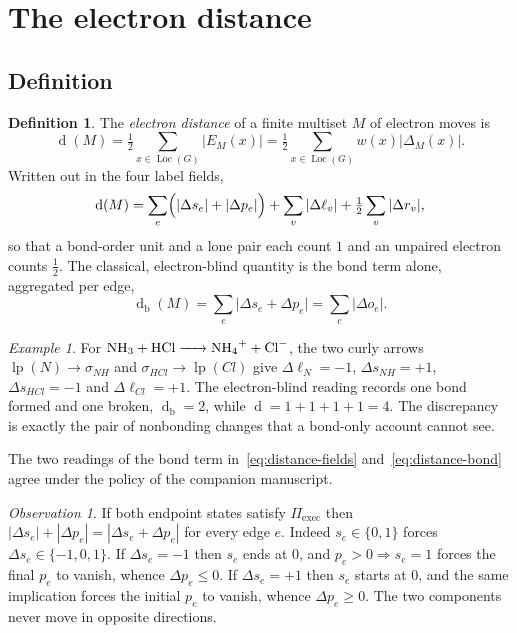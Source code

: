 \documentclass[11pt]{article}
\numberwithin{equation}{section}
\newcommand{\Loc}{\operatorname{Loc}}
\newcommand{\lp}{\operatorname{lp}}
\newcommand{\del}{\operatorname{d}}
\theoremstyle{plain}
\theoremstyle{definition}
\newtheorem{definition}[theorem]{Definition}
\theoremstyle{remark}
\newtheorem{observation}{Observation}
\newtheorem{example}[theorem]{Example}
\begin{document}
\section{The electron distance}
\label{sec:distance}

\subsection{Definition}

\begin{definition}
\label{def:distance}
The \emph{electron distance} of a finite multiset $M$ of electron moves is
\begin{equation}
  \del(M)=\tfrac12\sum_{x\in\Loc(G)}\bigl|E_M(x)\bigr|
        =\tfrac12\sum_{x\in\Loc(G)}w(x)\bigl|\Delta_M(x)\bigr| .
  \label{eq:distance}
\end{equation}
Written out in the four label fields,
\begin{equation}
  \del(M)=\sum_{e}\Bigl(|\Delta s_e|+|\Delta p_e|\Bigr)
         +\sum_{v}|\Delta\ell_v|
         +\tfrac12\sum_{v}|\Delta r_v| ,
  \label{eq:distance-fields}
\end{equation}
so that a bond-order unit and a lone pair each count $1$ and an unpaired
electron counts $\tfrac12$.  The classical, electron-blind quantity is the
bond term alone, aggregated per edge,
\begin{equation}
  \del_{\mathrm b}(M)=\sum_e\bigl|\Delta s_e+\Delta p_e\bigr|=\sum_e|\Delta o_e| .
  \label{eq:distance-bond}
\end{equation}
\end{definition}

\begin{example}
\label{ex:ammonia-hcl}
For $\ce{NH3 + HCl -> NH4+ + Cl-}$, the two curly arrows
$\lp(N)\to\sigma_{NH}$ and $\sigma_{HCl}\to\lp(Cl)$ give $\Delta\ell_N=-1$,
$\Delta s_{NH}=+1$, $\Delta s_{HCl}=-1$ and $\Delta\ell_{Cl}=+1$.  The
electron-blind reading records one bond formed and one broken,
$\del_{\mathrm b}=2$, while $\del=1+1+1+1=4$.  The discrepancy is exactly the
pair of nonbonding changes that a bond-only account cannot see.
\end{example}

The two readings of the bond term in~\eqref{eq:distance-fields}
and~\eqref{eq:distance-bond} agree under the policy of the companion
manuscript.

\begin{observation}
\label{obs:sigma-pi}
If both endpoint states satisfy $\Pi_{\mathrm{exec}}$ then
$|\Delta s_e|+|\Delta p_e|=|\Delta s_e+\Delta p_e|$ for every edge $e$.
Indeed $s_e\in\{0,1\}$ forces $\Delta s_e\in\{-1,0,1\}$.  If $\Delta s_e=-1$
then $s_e$ ends at $0$, and $p_e>0\Rightarrow s_e=1$ forces the final
$p_e$ to vanish, whence $\Delta p_e\le0$.  If $\Delta s_e=+1$ then $s_e$
starts at $0$, and the same implication forces the initial $p_e$ to vanish,
whence $\Delta p_e\ge0$.  The two components never move in opposite
directions.
\end{observation}
\end{document}
